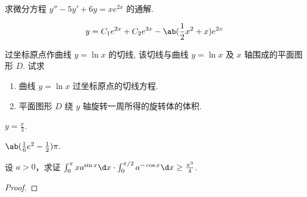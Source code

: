 \documentclass[quiet]{ctexart}
\begin{document}
\begin{problem}
  求微分方程 $y'' - 5y' + 6y = xe^{2x}$ 的通解.
\end{problem}
\begin{solution}
  \[y = C_1e^{2x} + C_2e^{3x} - \ab(\frac12x^2 + x)e^{2x}\]
\end{solution}

\begin{problem}
  过坐标原点作曲线 $y = \ln x$ 的切线, 
  该切线与曲线 $y = \ln x$ 及 $x$ 轴围成的平面图形 $D$. 试求
  \begin{enumerate}
    \item 曲线 $y = \ln x$ 过坐标原点的切线方程.
    \item 平面图形 $D$ 绕 $y$ 轴旋转一周所得的旋转体的体积.
  \end{enumerate}
\end{problem}
\begin{solution}
  \begin{enumerate*}
    \item $y = \frac x3$.
    \item $\ab(\frac16e^2 - \frac12)\pi$.
  \end{enumerate*}
\end{solution}

\begin{problem}
  设 $a > 0$，求证
  $ \int_0^\pi xa^{\sin x} \d x \cdot
    \int_0^{\pi/2} a^{-\cos x} \d x \geq \frac{\pi^3}{4}$.
\end{problem}
\begin{solution}
  \begin{proof}
    
  \end{proof}
\end{solution}
\end{document}
